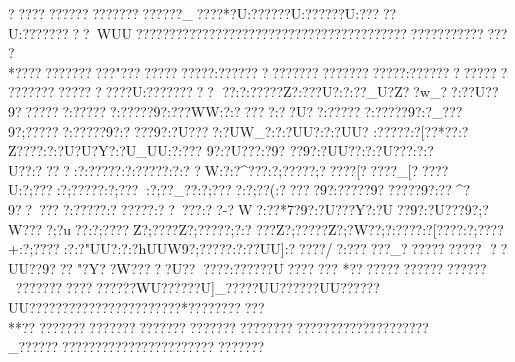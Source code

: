 {{{{{{{{{{{{{{{{{{{{{{{{{{{{{{{{{{{{{{{{{{{{{{{{{{{{{{{{{{{{{{{{{{{{{{{{{{{{{{{{{{{{{{{{{{{{{{{{{{{{{{{{{{{{{{{{{{{{{{{{{{{{{{{{{{{{{{{{{{{{{{{{{{{{{{{{{{{{{{{{{{{{{{{{{{{{{{{{{{{{{{{{{{{{{{{{{{{{{{{{{{{{{{{{{{{{{{{{{{{{{{{{{{{{{{{{{{{{{{{{{{{{{{{{{{{{{{{{{{{{{{{{{{{{{{{{{{{{{{{{{{{{{{{{{{{{{{{{{{{{{{{{{{{{{{{{{{{{{{{{{{{{{{{{{{{{{{{{{{{{{{{{{{{{{{{{{{{{{{{{{{{{{{{{{{{{{{{{{{{{{{{{{{{{{{{{{{{{{{{{{{{{{{{{{{{{{{{{{{{{{{{{{{{{{{{{{{{{{{{{{{{{{{{{{{{{{{{{{{{{{{{{{{{{{{{{{{{{{{{{{{{{{{{{{{{{{{{{{{{{{{{{{{{{{{{{{{{{{{{{{{{{{{{{{{{{{{{{{{{{{{{{{{{{{{{{{{{{{{{{{{{{{{{{{{{{{{{{{{{{{{{{{{{{{{{{{{{{{{{{{{{{{{{{{{{{{{{{{{{{{{{{{{{{{{{{{{{{{{{{{{{{{{{{{{{{{{{{{{{{{{{{{{{{{{{{{{{{{{{{{{{{{{{{{{{{{{{{{{{{{{{{{{{{{{{{{{{{{{{{{{{{{{{{{{{{{{{{{{{{{{{{{{{{{{{{{{{{{{{{{{{{{{{{{{{{{{{{{{{{{{{{{{{{{{{{{{{{{{{{{{{{{{{{{{{{{{ ????   ???? ????????????????_????*?U:??????U:??????U:?????U:?????????~WUU????????????????????????????????????????????????????????*??????????????"?????????????:??????????????????????????:??????????????????????????????U:?????????
??:?:?????Z?:???U?:?:??_U?Z??w_??:??U??9???????:??????:?????9?:???WW:?:?????:??U??:??????:?????9?:?_???9?;??????:?????9?:????9?:?U????:?UW_?:?:?UU?:?:?UU?
:?{???? :?[??*??:?Z?? ??:?:?U?U?Y?:?U_UU:?:???  9?:?U???:?9? 
??9?:?UU??:?:?U???:?:?U?? :????:?:?????:?:?????:?:?
?W:?:?^???:?;?????;?? ???[?????_[?????U:?;??? :?;?????:?;???:?;??_??:?;????:?;??  (:?????9?:?????9??????9?:??^?9??~????:?????:??????:??~???:??-?W?:??*7?9?:?U???Y?:?U??9?:?U???9?;?W????;?u??:?;????Z?;????Z?;?????;?:?
???Z?;?????Z?;?W??;?:? ???:?[????:?;????+:?;????:?:?"UU?:?:?hUUW9?;?????:?:??UU]:?????/?:?  ?????_?  ??}??? ?????
??UU??9???"?Y??W?????U?????   ?:??????U??  ?????
*?????  ????? ??????????????????????????WU??????U]_?????UU??????UU??????UU???????????????????????*???????????**??????????????????????????????????????????????????????????_????????????? ???????????????????????
}}}}}}}}}}}}}}}}}}}}}}}}}}}}}}}}}}}}}}}}}}}}}}}}}}}}}}}}}}}}}}}}}}}}}}}}}}}}}}}}}}}}}}}}}}}}}}}}}}}}}}}}}}}}}}}}}}}}}}}}}}}}}}}}}}}}}}}}}}}}}}}}}}}}}}}}}}}}}}}}}}}}}}}}}}}}}}}}}}}}}}}}}}}}}}}}}}}}}}}}}}}}}}}}}}}}}}}}}}}}}}}}}}}}}}}}}}}}}}}}}}}}}}}}}}}}}}}}}}}}}}}}}}}}}}}}}}}}}}}}}}}}}}}}}}}}}}}}}}}}}}}}}}}}}}}}}}}}}}}}}}}}}}}}}}}}}}}}}}}}}}}}}}}}}}}}}}}}}}}}}}}}}}}}}}}}}}}}}}}}}}}}}}}}}}}}}}}}}}}}}}}}}}}}}}}}}}}}}}}}}}}}}}}}}}}}}}}}}}}}}}}}}}}}}}}}}}}}}}}}}}}}}}}}}}}}}}}}}}}}}}}}}}}}}}}}}}}}}}}}}}}}}}}}}}}}}}}}}}}}}}}}}}}}}}}}}}}}}}}}}}}}}}}}}}}}}}}}}}}}}}}}}}}}}}}}}}}}}}}}}}}}}}}}}}}}}}}}}}}}}}}}}}}}}}}}}}}}}}}}}}}}}}}}}}}}}}}}}}}}}}}}}}}}}}}}}}}}}}}}}}}}}}}}}}}}}}}}}}}}}}}}}}}}}}}}}}}}}}}}}}}}}}}}}}}}}}}}}}}}}}}}}}}}}}}}}}}}}}}}}}}}}}}}}}}}}}}}}}}}}}}}}}}}}}}}}}}}}}}}}}}}}}}}}}}}}}}}}}}}}}}}}}}}}}}}}}
